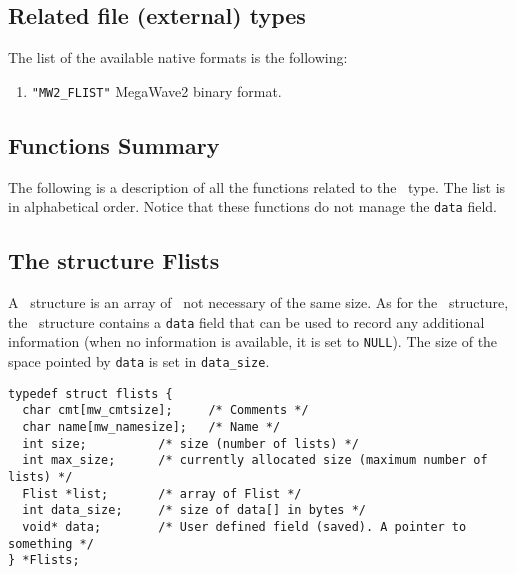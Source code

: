 \subsection{Related file (external) types}
\label{curves-polygons_flist-file_type}

The list of the available native formats is the following:
\begin{enumerate}
\item \verb+"MW2_FLIST"+ MegaWave2 binary format.
\end{enumerate}


\subsection{Functions Summary}
\label{curves-polygons_flist_function}

The following is a description of all the functions related to 
the \flist\ type. The list is in alphabetical order.
Notice that these functions do not manage the \verb+data+ field.

\newpage %






\subsection{The structure Flists}
\label{curves-polygons_flists}

A \flists{}\ structure is an array of \flist\ not necessary of the same size.
As for the  \flist\ structure, the \flists\ structure contains a \verb+data+ 
field that can be used to record any additional information
(when no information is available, it is set to \verb+NULL+).
The size of the space pointed by \verb+data+ is set in \verb+data_size+.

{\small
\begin{verbatim}
typedef struct flists {
  char cmt[mw_cmtsize];     /* Comments */
  char name[mw_namesize];   /* Name */
  int size;          /* size (number of lists) */
  int max_size;      /* currently allocated size (maximum number of lists) */
  Flist *list;       /* array of Flist */
  int data_size;     /* size of data[] in bytes */
  void* data;        /* User defined field (saved). A pointer to something */
} *Flists;

\end{verbatim}
}

